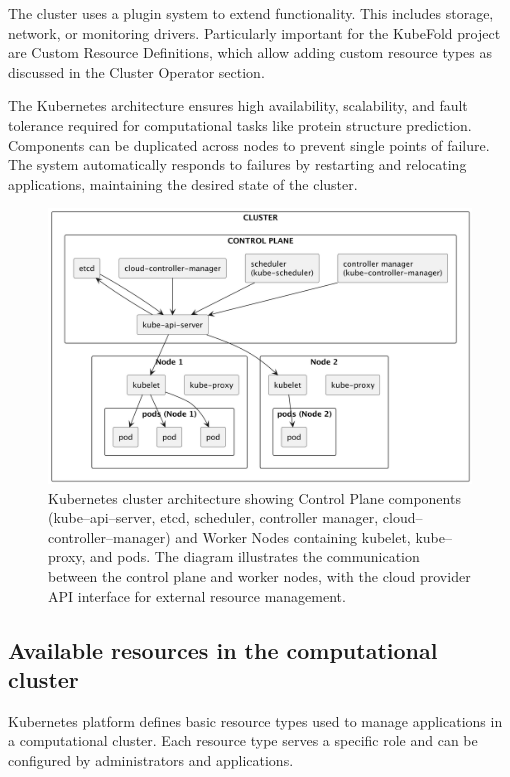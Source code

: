 The cluster uses a plugin system to extend functionality.
This includes storage, network, or monitoring drivers.
Particularly important for the KubeFold project are Custom Resource Definitions, which allow adding custom resource types as discussed in the Cluster Operator section.

The Kubernetes architecture ensures high availability, scalability, and fault tolerance required for computational tasks like protein structure prediction.
Components can be duplicated across nodes to prevent single points of failure.
The system automatically responds to failures by restarting and relocating applications, maintaining the desired state of the cluster.

\begin{figure}[htbp]
    \centering
    \includegraphics[width=\textwidth]{images/kubernetes}
    \caption{Kubernetes cluster architecture showing Control Plane components (kube--api--server, etcd, scheduler, controller manager, cloud--controller--manager) and Worker Nodes containing kubelet, kube--proxy, and pods. The diagram illustrates the communication between the control plane and worker nodes, with the cloud provider API interface for external resource management.}
    \label{fig:kubernetes-architecture}
\end{figure}

\subsection{Available resources in the computational cluster}
Kubernetes platform defines basic resource types used to manage applications in a computational cluster.
Each resource type serves a specific role and can be configured by administrators and applications.

